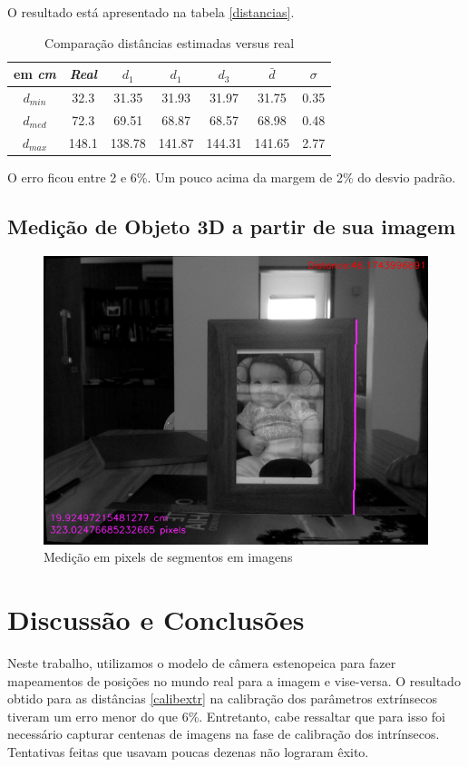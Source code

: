 \documentclass[conference]{IEEEtran}
\begin{document}
O resultado está apresentado na tabela \ref{distancias}.
\begin{table}[htbp]\label{distancias}
\caption{Comparação distâncias estimadas versus real}
\begin{center}
\begin{tabular}{|c|c|c|c|c|c|c|}
\hline
em \textit{cm}& \textbf{\textit{Real}}& \(d_{1}\)&\(d_{1}\)&\(d_{3}\)&\(\bar{d}\)& \textbf{\(\sigma\)} \\
\hline
\(d_{min}\)& 32.3& 31.35& 31.93 & 31.97& 31.75& 0.35\\
\hline
\(d_{med}\)& 72.3& 69.51& 68.87 & 68.57& 68.98& 0.48\\
\hline
\(d_{max}\)& 148.1& 138.78& 141.87 & 144.31& 141.65& 2.77\\
\hline

\end{tabular}
\label{tab1}
\end{center}
\end{table}
O erro ficou entre 2 e 6\%. Um pouco acima da margem de 2\% do desvio padrão.
\subsection{Medição de Objeto 3D a partir de sua imagem}
\begin{figure}[ht!]\label{baboon}
\begin{center}
\includegraphics[width= .9\columnwidth]{projection-2.png}
\caption{Medição em pixels de segmentos em imagens}
\end{center}
\end{figure}
\section{Discussão e Conclusões}
Neste trabalho, utilizamos o modelo de câmera estenopeica para fazer mapeamentos de posições no mundo real para a imagem e vise-versa. O resultado obtido para as distâncias \ref{calibextr} na calibração dos parâmetros extrínsecos tiveram um erro menor do que 6\%. Entretanto, cabe ressaltar que para isso foi necessário capturar centenas de imagens na fase de calibração dos intrínsecos. Tentativas feitas que usavam poucas dezenas não lograram êxito. 




\end{document}
